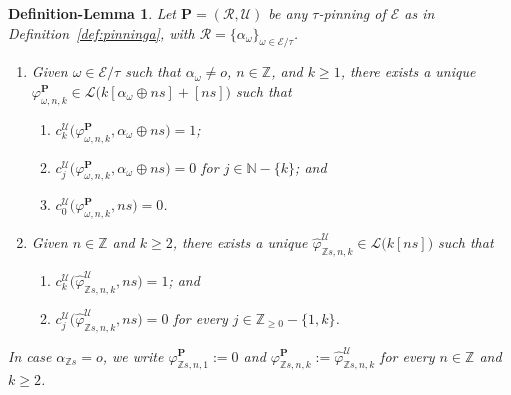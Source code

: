 \documentclass[preprint,12pt]{elsarticle}
\numberwithin{equation}{section} %
\theoremstyle{theorem}
\newtheorem{deflem}[theorem]{Definition-Lemma}
\theoremstyle{definition}
\newcommand{\ec}{\mathcal{E}} %
\newcommand{\idec}{{o}} %
\newcommand{\orbita}{{\ec/\tau}} %
\newcommand{\Z}{\mathbb{Z}} %
\begin{document}
\begin{deflem} \label{deflem:phia}Let $\mathbf{P}=(\mathcal{R},\mathcal{U})$ be any $\tau$-pinning of $\ec$ as in Definition~\ref{def:pinninga}, with $\mathcal{R}=\{\alpha_\omega\}_{ \omega\in\orbita}$. 
\begin{enumerate}
    
    \item Given $\omega\in\orbita$ such that $\alpha_\omega\neq\idec$, $n\in\Z$, and $k\geq 1$, there exists a unique $\varphi^\mathbf{P}_{\omega,n,k}\in\mathcal{L}\bigl(k[\alpha_\omega\oplus ns]+[ns]\bigr)$ such that \begin{enumerate}
    \item $c_k^\mathcal{U}\bigl(\varphi^\mathbf{P}_{\omega,n,k},\alpha_\omega\oplus ns\bigr)=1$; 
    \item $c_j^\mathcal{U}\bigl(\varphi^\mathbf{P}_{\omega,n,k},\alpha_\omega\oplus ns\bigr)=0$ for $j\in\mathbb{N}-\{k\}$; and 
    \item $c_0^\mathcal{U}\bigl(\varphi^\mathbf{P}_{\omega,n,k},ns\bigr)=0$.
    \end{enumerate}
    \item Given $n\in\Z$ and $k\geq 2$, there exists a unique $\hat{\varphi}^\mathcal{U}_{\Z s,n,k}\in\mathcal{L}\bigl(k[ns]\bigr)$ such that \begin{enumerate}
    \item $c_k^\mathcal{U}\bigl(\hat{\varphi}^\mathcal{U}_{\Z s,n,k},ns\bigr)=1$; and
        \item $c_j^\mathcal{U}\bigl(\hat{\varphi}^\mathcal{U}_{\Z s,n,k},ns\bigr)=0$ for every $j\in\Z_{\geq 0}-\{1,k\}$.
    \end{enumerate}
\end{enumerate}
In case $\alpha_{\Z s}=\idec$, we write $\varphi^\mathbf{P}_{\Z s,n,1}:=0$ and $\varphi^{\mathbf{P}}_{\Z s,n,k}:=\hat{\varphi}^{\mathcal{U}}_{\Z s,n,k}$ for every $n\in\Z$ and $k\geq 2$.
\end{deflem}
\end{document}
